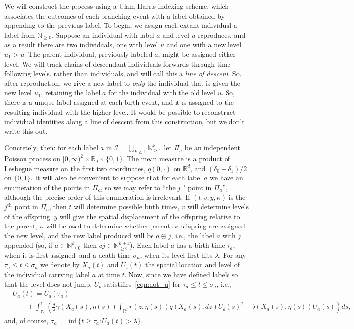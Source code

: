 \documentclass[12pt]{article}
\newcommand{\IR}{\mathbb R}
\newcommand{\IN}{\mathbb N}
\newcommand{\labelspace}{\mathcal{I}} %
\newcommand{\concat}{\oplus}   %
\begin{document}
We will construct the process using a Ulam-Harris indexing scheme,
which associates the outcomes of each branching event with a label obtained
by appending to the previous label.
To begin, we assign each extant individual a label from $\IN_{\ge 0}$.
Suppose an individual with label $a$ and level $u$ reproduces,
and as a result there are two individuals, one with level $u$ and one with a new level $u_1 > u$.
The parent individual, previously labeled $a$, might be assigned either level.
We will track chains of descendant individuals forwards through time
following levels, rather than individuals, and will call this a \emph{line of descent}.
So, after reproduction, we give a new label to \emph{only} the individual
that is given the new level $u_1$,
retaining the label $a$ for the individual with the old level $u$.
So, there is a unique label assigned at each birth event,
and it is assigned to the resulting individual with the higher level.
It would be possible to reconstruct individual identities along a line of descent
from this construction,
but we don't write this out.

Concretely, then: for each label $a$ in
$\labelspace = \bigcup_{k \ge 1} \IN_{\ge 1}^k$
let $\Pi_a$ be an independent Poisson process on $[0, \infty)^2 \times \IR_d \times \{0,1\}$.
The mean measure is a product of Lesbegue measure on the first two coordinates,
$q(0, \cdot)$ on $\IR^d$, and $(\delta_0 + \delta_1)/2$ on $\{0, 1\}$.
It will also be convenient
to suppose that for each label $a$ we have an enumeration of the points in $\Pi_a$,
so we may refer to ``the $j^\text{th}$ point in $\Pi_a$'',
although the precise order of this enumeration is irrelevant.
If $(t, v, y, \kappa)$ is the $j^\text{th}$ point in $\Pi_a$,
then $t$ will determine possible birth times,
$v$ will determine levels of the offspring,
$y$ will give the spatial displacement of the offspring relative to the parent,
$\kappa$ will be used to determine whether parent or offspring are assigned the new level,
and the new label produced will be $a \concat j$,
i.e., the label $a$ with $j$ appended (so, if $a \in \IN_{\ge 0}^k$ then $aj \in \IN_{\ge 0}^{k+1}$).
Each label $a$ has a birth time $\tau_a$,
when it is first assigned,
and a death time $\sigma_a$, when its level first hits $\lambda$.
For any $\tau_a \le t \le \sigma_a$ we denote by $X_a(t)$ and $U_a(t)$ the spatial location and level
of the individual carrying label $a$ at time $t$.
Now, since we have defined labels so that the level does not jump,
$U_a$ satistifies~\eqref{eqn:dot_u} for $\tau_a \le t \le \sigma_a$, i.e.,
\begin{equation} \label{eqn:U_line_of_descent}
    \begin{split}
& U_a(t)
    =
    U_a(\tau_a) \\
&\qquad {}   
    + \int_{\tau_a}^{t}
    \left(
        \frac{\theta}{\lambda} \gamma(X_a(s),\eta(s))
        \int_{\IR^d} r(z,\eta(s)) q(X_a(s),dz) U_a(s)^2
        -
        b(X_a(s),\eta(s)) U_a(s)
    \right)
    ds ,
\end{split}
\end{equation}
and, of course, $\sigma_a = \inf\{t \ge \tau_a : U_a(t) > \lambda\}$.
\end{document}
